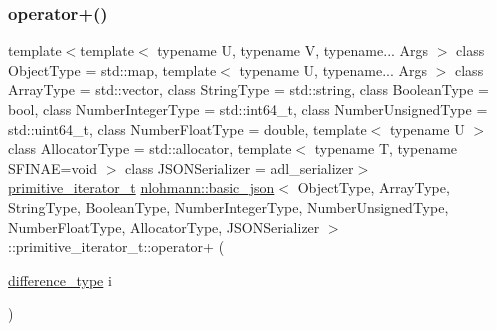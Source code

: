 \subsubsection{\texorpdfstring{operator+()}{operator+()}}
{\footnotesize\ttfamily template$<$template$<$ typename U, typename V, typename... Args $>$ class Object\+Type = std\+::map, template$<$ typename U, typename... Args $>$ class Array\+Type = std\+::vector, class String\+Type  = std\+::string, class Boolean\+Type  = bool, class Number\+Integer\+Type  = std\+::int64\+\_\+t, class Number\+Unsigned\+Type  = std\+::uint64\+\_\+t, class Number\+Float\+Type  = double, template$<$ typename U $>$ class Allocator\+Type = std\+::allocator, template$<$ typename T, typename S\+F\+I\+N\+A\+E=void $>$ class J\+S\+O\+N\+Serializer = adl\+\_\+serializer$>$ \\
\hyperlink{classnlohmann_1_1basic__json_1_1primitive__iterator__t}{primitive\+\_\+iterator\+\_\+t} \hyperlink{classnlohmann_1_1basic__json}{nlohmann\+::basic\+\_\+json}$<$ Object\+Type, Array\+Type, String\+Type, Boolean\+Type, Number\+Integer\+Type, Number\+Unsigned\+Type, Number\+Float\+Type, Allocator\+Type, J\+S\+O\+N\+Serializer $>$\+::primitive\+\_\+iterator\+\_\+t\+::operator+ (\begin{DoxyParamCaption}\item[{\hyperlink{classnlohmann_1_1basic__json_afe7c1303357e19cea9527af4e9a31d8f}{difference\+\_\+type}}]{i }\end{DoxyParamCaption})\hspace{0.3cm}{\ttfamily [inline]}}

\mbox{\label{classnlohmann_1_1basic__json_1_1primitive__iterator__t_a6963279f59254aada0eb71877d44d729}} 
